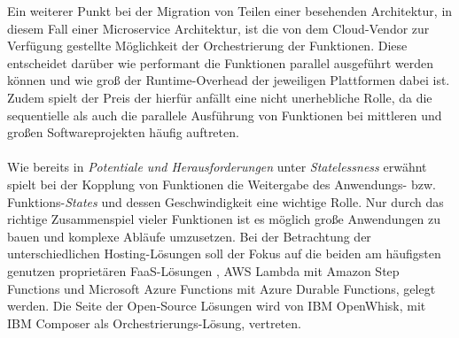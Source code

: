 Ein weiterer Punkt bei der Migration von Teilen einer besehenden Architektur, in diesem Fall einer Microservice Architektur, ist die von dem Cloud-Vendor zur Verfügung gestellte Möglichkeit der Orchestrierung der Funktionen. Diese entscheidet darüber wie performant die Funktionen parallel ausgeführt werden können und wie groß der Runtime-Overhead der jeweiligen Plattformen dabei ist. Zudem spielt der Preis der hierfür anfällt eine nicht unerhebliche Rolle, da die sequentielle als auch die parallele Ausführung von Funktionen bei mittleren und großen Softwareprojekten häufig auftreten.\\\\
Wie bereits in \textit{Potentiale und Herausforderungen} unter \textit{Statelessness} erwähnt spielt bei der Kopplung von Funktionen die Weitergabe des Anwendungs- bzw. Funktions-\textit{States} und dessen Geschwindigkeit eine wichtige Rolle. Nur durch das richtige Zusammenspiel vieler Funktionen ist es möglich große Anwendungen zu bauen und komplexe Abläufe umzusetzen. Bei der Betrachtung der unterschiedlichen Hosting-Lösungen soll der Fokus auf die beiden am häufigsten genutzen proprietären FaaS-Lösungen \cite{leitner2019mixed}, AWS Lambda mit Amazon Step Functions und Microsoft Azure Functions mit Azure Durable Functions, gelegt werden. Die Seite der Open-Source Lösungen wird von IBM OpenWhisk, mit IBM Composer als Orchestrierungs-Lösung, vertreten.\\\\



